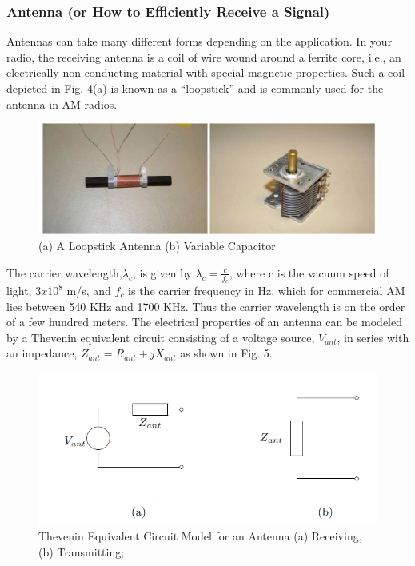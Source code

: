 \documentclass[12pt]{article}
\begin{document}
\subsubsection{Antenna (or How to Efficiently Receive a Signal)}
Antennas can take many different forms depending on the application. In your radio, the receiving
antenna is a coil of wire wound around a ferrite core, i.e., an electrically non-conducting material with
special magnetic properties. Such a coil depicted in Fig. 4(a) is known as a “loopstick” and is commonly
used for the antenna in AM radios.
\begin{figure}[H]
\centering
\includegraphics[scale=0.5]{P4.jpg}
\caption{(a) A Loopstick Antenna (b) Variable Capacitor}
\end{figure}
\par The carrier wavelength,$\lambda_c$, is given by $\lambda_c=\frac{c}{f_c}$, where c is the vacuum speed of light, $3x10^8$ m/s, and $f_c$ is the carrier frequency in Hz, which for commercial AM lies between 540 KHz and 1700 KHz. Thus the
carrier wavelength is on the order of a few hundred meters. The electrical properties of an antenna can be
modeled by a Thevenin equivalent circuit consisting of a voltage source, $V_{ant}$, in series with an impedance,
$Z_{ant}=R_{ant} + jX_{ant}$ as shown in Fig. 5.
\begin{figure}[H]
\centering
\includegraphics[scale=0.5]{P5.jpg}
\caption{Thevenin Equivalent Circuit Model for an Antenna (a) Receiving, (b) Transmitting;}
\end{figure}
\end{document}
